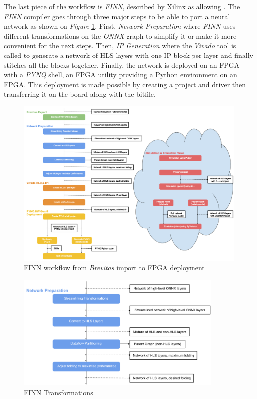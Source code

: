 The last piece of the workflow is \emph{FINN}, described by Xilinx as allowing . The \emph{FINN} compiler goes through three major steps to be able to port a neural network as shown on \emph{Figure} \ref{fig:FINNWholeFlow}. First, \emph{Network Preparation} where \emph{FINN} uses different transformations on the \emph{ONNX} graph to simplify it or make it more convenient for the next steps. Then, \emph{IP Generation} where the \emph{Vivado} tool is called to generate a network of HLS layers with one IP block per layer and finally stitches all the blocks together. Finally, the network is deployed on an FPGA with a \emph{PYNQ} shell, an FPGA utility providing a Python environment on an FPGA. This deployment is made possible by creating a project and driver then transferring it on the board along with the bitfile.

\begin{figure}[htbp]
	\centering
		\includegraphics[width=16cm]{Figures/FINNWholeFlow.png}
	\caption[FINN whole flow]{FINN workflow from \emph{Brevitas} import to FPGA deployment}
	\label{fig:FINNWholeFlow}
\end{figure}

\begin{figure}[htbp]
	\centering
		\includegraphics[width=10cm]{Figures/FINNTransformations.png}
	\caption[FINN Transformations]{FINN Transformations}
	\label{fig:FINNTransformations}
\end{figure}

